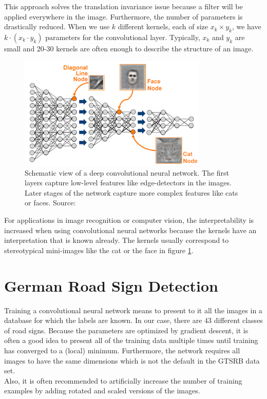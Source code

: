 \documentclass[11pt,a4paper]{article}
\begin{document}
This approach solves the translation invariance issue because a filter will be applied everywhere in the image. Furthermore, the number of parameters is drastically reduced. When we use $k$ different kernels, each of size $x_k \times y_k$, we have $k \cdot (x_k \cdot y_k)$ parameters for the convolutional layer. Typically, $x_k$ and $y_k$ are small and 20-30 kernels are often enough to describe the structure of an image.\\
\begin{figure}[h]
	\includegraphics[width=0.8\textwidth]{deep-learning.png}
	\centering
	\caption[Deep Convolutional Neural Network]{Schematic view of a deep convolutional neural network. The first layers capture low-level features like edge-detectors in the images. Later stages of the network capture more complex features like cats or faces. Source: \cite{deepNetworkImage}}
	\label{fig:deeplearning}
\end{figure}
For applications in image recognition or computer vision, the interpretability is increased when using convolutional neural networks because the kernels have an interpretation that is known already. The kernels usually correspond to stereotypical mini-images like the cat or the face in figure \ref{fig:deeplearning}.

\section{German Road Sign Detection}
Training a convolutional neural network means to present to it all the images in a database for which the labels are known. In our case, there are 43 different classes of road signs. Because the parameters are optimized by gradient descent, it is often a good idea to present all of the training data multiple times until training has converged to a (local) minimum. Furthermore, the network requires all images to have the same dimensions which is not the default in the GTSRB data set.\\
Also, it is often recommended to artificially increase the number of training examples by adding rotated and scaled versions of the images.
\end{document}
